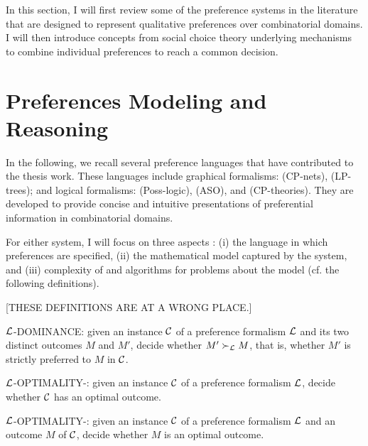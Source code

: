 
In this section, I will first review some of the preference
systems in the literature that are designed to represent
qualitative preferences over combinatorial domains. 
I will then introduce concepts
from social choice theory underlying mechanisms to
combine individual preferences to reach a common decision.

\section{Preferences Modeling and Reasoning \label{sec:pref_reasoning}}
In the following, we recall several preference languages that
have contributed to the thesis work.
These languages include graphical formalisms:
 (CP-nets),
 (LP-trees);
and logical formalisms:
 (Poss-logic),
 (ASO), and
 (CP-theories).
They are developed to provide concise and intuitive
presentations of preferential information in 
combinatorial domains.


For either system, I will focus on three aspects \cite{Domshlak20111037}:
(i) the language in which preferences are specified,
(ii) the mathematical model captured by the system,
and (iii) complexity of and algorithms for
problems about the model (cf. the following definitions).

[THESE DEFINITIONS ARE AT A WRONG PLACE.]
\begin{definition}
\label{def:dom}
  $\mathcal{L}$-DOMINANCE: given an instance $\mathcal{C}$ of a preference
	formalism $\mathcal{L}$ and its two distinct outcomes
  $M$ and $M'$, decide whether $M' \succ_{\mathcal{L}} M$, that is,
  whether $M'$ is strictly preferred to $M$ in $\mathcal{C}$.
\end{definition}

\begin{definition}
\label{def:opt1}
  $\mathcal{L}$-OPTIMALITY-: given an instance $\mathcal{C}$ of a preference
	formalism $\mathcal{L}$,
  decide whether $\mathcal{C}$ has an optimal outcome.
\end{definition}

\begin{definition}
\label{def:opt2}
  $\mathcal{L}$-OPTIMALITY-: given an instance $\mathcal{C}$ of a preference
	formalism $\mathcal{L}$ and an outcome $M$ of $\mathcal{C}$,
  decide whether $M$ is an optimal outcome.
\end{definition}

